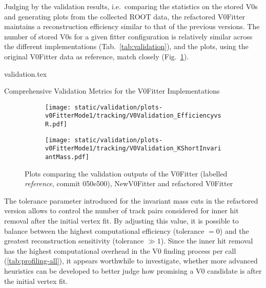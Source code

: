 Judging by the validation results, i.e.\ comparing the statistics on the stored V0s and generating plots from the collected ROOT data, the refactored V0Fitter maintains a reconstruction efficiency similar to that of the previous versions.
The number of stored V0s for a given fitter configuration is relatively similar across the different implementations (Tab.\ \ref{tab:validation}), and the plots, using the original V0Fitter data as reference, match closely (Fig.\ \ref{fig:validation-plots}).

\begin{table}[h]
  \centering
  {validation.tex}
  \caption{Comprehensive Validation Metrics for the V0Fitter Implementations}\label{tab:validation}
\end{table}

\begin{figure}[h]
  \centering
  \begin{subfigure}{.5\linewidth}
    \centering
    \texttt{[image: static/validation/plots-v0FitterMode1/tracking/V0Validation\_EfficiencyvsR.pdf]}
  \end{subfigure}%
  \begin{subfigure}{.5\linewidth}
    \centering
    \texttt{[image: static/validation/plots-v0FitterMode1/tracking/V0Validation\_KShortInvariantMass.pdf]}
  \end{subfigure}
  \caption{Plots comparing the validation outputs of the V0Fitter (labelled \emph{reference}, commit 050e500), NewV0Fitter and refactored V0Fitter}
  \label{fig:validation-plots}
\end{figure}

The tolerance parameter introduced for the invariant mass cuts in the refactored version allows to control the number of track pairs considered for inner hit removal after the initial vertex fit.
By adjusting this value, it is possible to balance between the highest computational efficiency (tolerance $= 0$) and the greatest reconstruction sensitivity (tolerance $\gg 1$).
Since the inner hit removal has the highest computational overhead in the V0 finding process per call (\ref{tab:profiling-all}), it appears worthwhile to investigate, whether more advanced heuristics can be developed to better judge how promising a V0 candidate is after the initial vertex fit.

